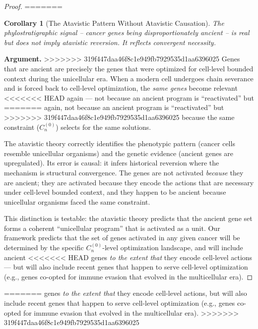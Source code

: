 \documentclass[11pt]{article}
\newtheorem{corollary}[theorem]{Corollary}
\theoremstyle{definition}
\theoremstyle{remark}
\begin{document}
\begin{proof}
=======
\medskip

\begin{corollary}[The Atavistic Pattern Without Atavistic Causation]
\label{cor:atavistic}
The phylostratigraphic signal -- cancer genes being
disproportionately ancient \cite{Trigos2017} -- is real but does
not imply atavistic reversion. It reflects convergent necessity.
\end{corollary}

\textbf{Argument.}
>>>>>>> 319f447daa46f8c1e949fb7929535d1aa6396025
Genes that are ancient are precisely the genes that were optimized
for cell-level bounded context during the unicellular era. When a
modern cell undergoes chain severance and is forced back to
cell-level optimization, the \emph{same genes} become relevant
<<<<<<< HEAD
again --- not because an ancient program is ``reactivated'' but
=======
again, not because an ancient program is ``reactivated'' but
>>>>>>> 319f447daa46f8c1e949fb7929535d1aa6396025
because the same constraint ($C_n^{(0)}$) selects for the same
solutions.

The atavistic theory \cite{Davies2011} correctly identifies the
phenotypic pattern (cancer cells resemble unicellular organisms) and
the genetic evidence (ancient genes are upregulated). Its error is
causal: it infers historical reversion where the mechanism is
structural convergence. The genes are not activated \emph{because}
they are ancient; they are activated because they encode the actions
that are necessary under cell-level bounded context, and they happen
to be ancient because unicellular organisms faced the same constraint.

This distinction is testable: the atavistic theory predicts that the
ancient gene set forms a coherent ``unicellular program'' that is
activated as a unit. Our framework predicts that the set of genes
activated in any given cancer will be determined by the specific
$C_n^{(0)}$-level optimization landscape, and will include ancient
<<<<<<< HEAD
genes \emph{to the extent that} they encode cell-level actions ---
but will also include recent genes that happen to serve cell-level
optimization (e.g., genes co-opted for immune evasion that evolved
in the multicellular era).
\end{proof}
=======
genes \emph{to the extent that} they encode cell-level actions,
but will also include recent genes that happen to serve cell-level
optimization (e.g., genes co-opted for immune evasion that evolved
in the multicellular era).
\medskip
>>>>>>> 319f447daa46f8c1e949fb7929535d1aa6396025
\end{document}
